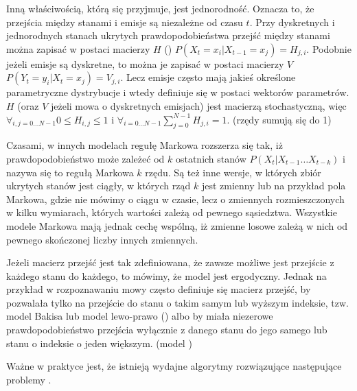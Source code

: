 Inną właściwością, którą się przyjmuje, jest jednorodność. Oznacza to, że przejścia między stanami i emisje są
niezależne od czasu $t$. Przy dyskretnych i jednorodnych stanach ukrytych prawdopodobieństwa przejść
między stanami można zapisać w postaci macierzy $H$ () $P(X_t = x_i | X_{t-1} = x_j) = H_{j, i}$.
Podobnie jeżeli emisje są dyskretne, to można je zapisać w postaci macierzy $V$ $P(Y_t = y_i | X_t = x_j) = V_{j, i}$.
Lecz emisje często mają jakieś określone parametryczne dystrybucje i wtedy definiuje się w postaci wektorów parametrów.
$H$ (oraz $V$ jeżeli mowa o dyskretnych emisjach) jest macierzą stochastyczną, więc $\forall_{i, j = 0 \dots N - 1} 0 \leq H_{i, j} \leq 1$ i $\forall_{i = 0 \dots N - 1} \sum_{j = 0}^{N - 1} H_{j, i} = 1$. (rzędy sumują się do 1)

Czasami, w innych modelach regułę Markowa rozszerza się tak, iż prawdopodobieństwo może zależeć od $k$ ostatnich stanów
$P(X_t | X_{t-1} \dots X_{t-k})$ i nazywa się to regułą Markowa $k$ rzędu. Są też inne wersje, w których zbiór
ukrytych stanów jest ciągły, w których rząd $k$ jest zmienny lub na przykład pola Markowa,
gdzie nie mówimy o ciągu w czasie, lecz o zmiennych rozmieszczonych
w kilku wymiarach, których wartości zależą od pewnego sąsiedztwa. Wszystkie modele Markowa mają jednak cechę wspólną, iż
zmienne losowe zależą w nich od pewnego skończonej liczby innych zmiennych.

Jeżeli macierz przejść jest tak zdefiniowana, że zawsze możliwe jest przejście z każdego stanu do każdego, to
mówimy, że model jest ergodyczny. Jednak na przykład w rozpoznawaniu mowy często definiuje się macierz przejść,
by pozwalała tylko na przejście do stanu o takim samym lub wyższym indeksie, tzw. model Bakisa lub model lewo-prawo
() albo by miała niezerowe prawdopodobieństwo przejścia wyłącznie z danego stanu do jego
samego lub stanu o indeksie o jeden większym. (model )

Ważne w praktyce jest, że istnieją wydajne algorytmy rozwiązujące następujące problemy .

